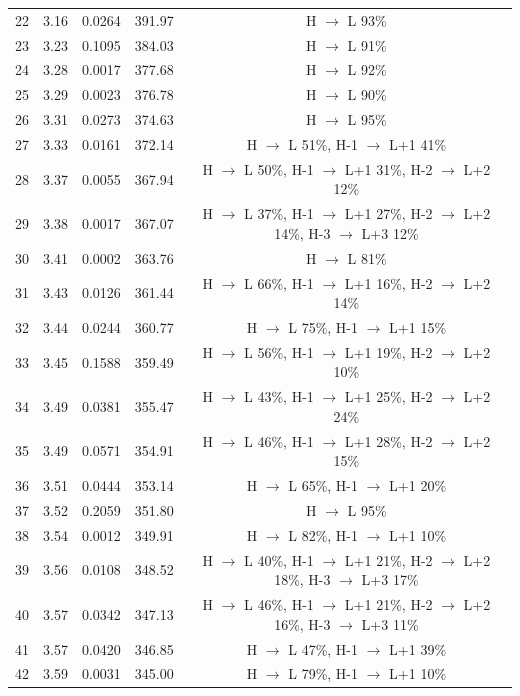 \begin{table}[H]
{\begin{center}
\begin{tabular}{ccccc}
22 & 3.16 & 0.0264 & 391.97 & H $\rightarrow$ L 93\% \\
23 & 3.23 & 0.1095 & 384.03 & H $\rightarrow$ L 91\% \\
24 & 3.28 & 0.0017 & 377.68 & H $\rightarrow$ L 92\% \\
25 & 3.29 & 0.0023 & 376.78 & H $\rightarrow$ L 90\% \\
26 & 3.31 & 0.0273 & 374.63 & H $\rightarrow$ L 95\% \\
27 & 3.33 & 0.0161 & 372.14 & H $\rightarrow$ L 51\%, H-1 $\rightarrow$ L+1 41\% \\
28 & 3.37 & 0.0055 & 367.94 & H $\rightarrow$ L 50\%, H-1 $\rightarrow$ L+1 31\%, H-2 $\rightarrow$ L+2 12\% \\
29 & 3.38 & 0.0017 & 367.07 & H $\rightarrow$ L 37\%, H-1 $\rightarrow$ L+1 27\%, H-2 $\rightarrow$ L+2 14\%, H-3 $\rightarrow$ L+3 12\% \\
30 & 3.41 & 0.0002 & 363.76 & H $\rightarrow$ L 81\% \\
31 & 3.43 & 0.0126 & 361.44 & H $\rightarrow$ L 66\%, H-1 $\rightarrow$ L+1 16\%, H-2 $\rightarrow$ L+2 14\% \\
32 & 3.44 & 0.0244 & 360.77 & H $\rightarrow$ L 75\%, H-1 $\rightarrow$ L+1 15\% \\
33 & 3.45 & 0.1588 & 359.49 & H $\rightarrow$ L 56\%, H-1 $\rightarrow$ L+1 19\%, H-2 $\rightarrow$ L+2 10\% \\
34 & 3.49 & 0.0381 & 355.47 & H $\rightarrow$ L 43\%, H-1 $\rightarrow$ L+1 25\%, H-2 $\rightarrow$ L+2 24\% \\
35 & 3.49 & 0.0571 & 354.91 & H $\rightarrow$ L 46\%, H-1 $\rightarrow$ L+1 28\%, H-2 $\rightarrow$ L+2 15\% \\
36 & 3.51 & 0.0444 & 353.14 & H $\rightarrow$ L 65\%, H-1 $\rightarrow$ L+1 20\% \\
37 & 3.52 & 0.2059 & 351.80 & H $\rightarrow$ L 95\% \\
38 & 3.54 & 0.0012 & 349.91 & H $\rightarrow$ L 82\%, H-1 $\rightarrow$ L+1 10\% \\
39 & 3.56 & 0.0108 & 348.52 & H $\rightarrow$ L 40\%, H-1 $\rightarrow$ L+1 21\%, H-2 $\rightarrow$ L+2 18\%, H-3 $\rightarrow$ L+3 17\% \\
40 & 3.57 & 0.0342 & 347.13 & H $\rightarrow$ L 46\%, H-1 $\rightarrow$ L+1 21\%, H-2 $\rightarrow$ L+2 16\%, H-3 $\rightarrow$ L+3 11\% \\
41 & 3.57 & 0.0420 & 346.85 & H $\rightarrow$ L 47\%, H-1 $\rightarrow$ L+1 39\% \\
42 & 3.59 & 0.0031 & 345.00 & H $\rightarrow$ L 79\%, H-1 $\rightarrow$ L+1 10\% \\

\end{tabular}
\end{center}}
\end{table}

